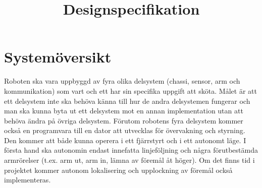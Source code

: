 \documentclass[a4paper,12pt]{article}
\title{Designspecifikation}
\renewcommand{\thepage}{\roman{page}}
\begin{document}
\LIPStitelsida

\begin{LIPSprojektidentitet}
\end{LIPSprojektidentitet}


\renewcommand*\contentsname{Innehåll}
\begin{spacing}{0.5}
\tableofcontents{}
\end{spacing}
\newpage

\begin{LIPSdokumenthistorik}
\end{LIPSdokumenthistorik}
\newpage

\renewcommand{\thepage}{\arabic{page}}
\setcounter{page}{1}

\section{Systemöversikt}

Roboten ska vara uppbyggd av fyra olika delsystem (chassi, sensor, arm och kommunikation) som vart och ett har sin specifika uppgift att sköta. Målet är att ett delsystem inte ska behöva känna till hur de andra delsystemen fungerar och man ska kunna byta ut ett delsystem mot en annan implementation utan att behöva ändra på övriga delsystem. Förutom robotens fyra delsystem kommer också en programvara till en dator att utvecklas för övervakning och styrning. Den kommer att både kunna operera i ett fjärrstyrt och i ett autonomt läge. I första hand ska autonomin endast innefatta linjeföljning och några förutbestämda armrörelser (t.ex. arm ut, arm in, lämna av föremål åt höger). Om det finns tid i projektet kommer autonom lokalisering och upplockning av föremål också implementeras.
\end{document}
